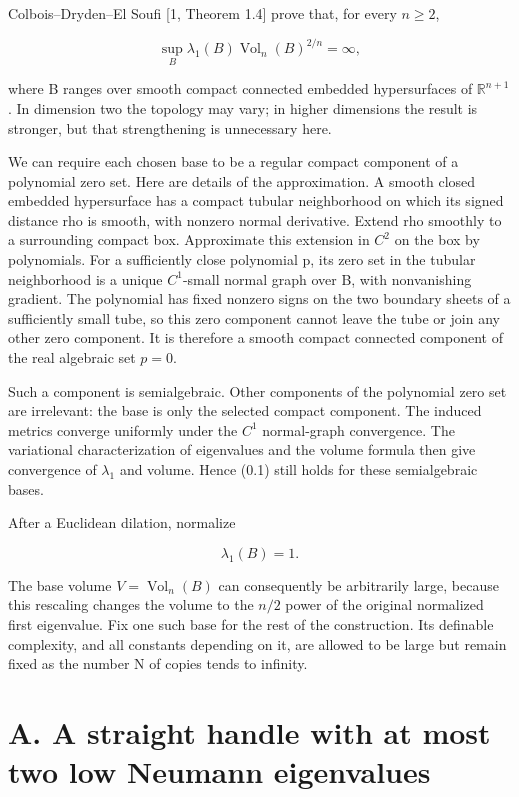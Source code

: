 \documentclass[11pt,a4paper]{article}
\begin{document}
Colbois--Dryden--El Soufi {[}1, Theorem 1.4{]} prove that, for every
\(n\ge 2\),

\[
 \sup_B \lambda_1(B)\operatorname{Vol}_n(B)^{2/n}=\infty,
 \tag{0.1}
\]

where B ranges over smooth compact connected embedded hypersurfaces of
\(\mathbb R^{n+1}\). In dimension two the topology may vary; in higher
dimensions the result is stronger, but that strengthening is unnecessary
here.

We can require each chosen base to be a regular compact component of a
polynomial zero set. Here are details of the approximation. A smooth
closed embedded hypersurface has a compact tubular neighborhood on which
its signed distance rho is smooth, with nonzero normal derivative.
Extend rho smoothly to a surrounding compact box. Approximate this
extension in \(C^2\) on the box by polynomials. For a sufficiently close
polynomial p, its zero set in the tubular neighborhood is a unique
\(C^1\)-small normal graph over B, with nonvanishing gradient. The
polynomial has fixed nonzero signs on the two boundary sheets of a
sufficiently small tube, so this zero component cannot leave the tube or
join any other zero component. It is therefore a smooth compact
connected component of the real algebraic set \({p=0}\).

Such a component is semialgebraic. Other components of the polynomial
zero set are irrelevant: the base is only the selected compact
component. The induced metrics converge uniformly under the \(C^1\)
normal-graph convergence. The variational characterization of
eigenvalues and the volume formula then give convergence of
\(\lambda _1\) and volume. Hence (0.1) still holds for these
semialgebraic bases.

After a Euclidean dilation, normalize

\[
 \lambda_1(B)=1.
\]

The base volume \(V=\operatorname{Vol} _n(B)\) can consequently be
arbitrarily large, because this rescaling changes the volume to the
\(n/2\) power of the original normalized first eigenvalue. Fix one such
base for the rest of the construction. Its definable complexity, and all
constants depending on it, are allowed to be large but remain fixed as
the number N of copies tends to infinity.

\hypertarget{1022-a.-a-straight-handle-with-at-most-two-low-neumann-eigenvalues}{%
\section{A. A straight handle with at most two low Neumann
eigenvalues}\label{1022-a.-a-straight-handle-with-at-most-two-low-neumann-eigenvalues}}
\end{document}
